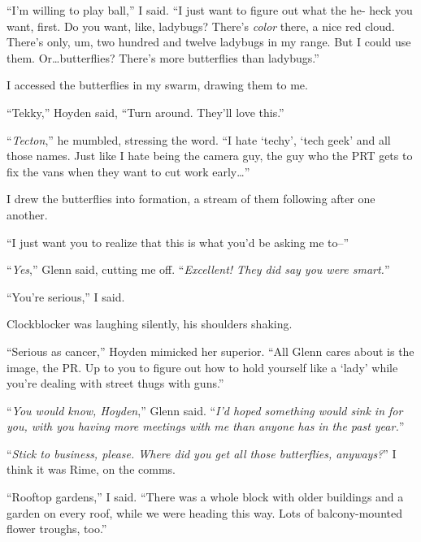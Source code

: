 ``I'm willing to play ball,'' I said.  ``I just want to figure out what the he- heck you want, first.  Do you want, like, ladybugs?  There's \emph{color} there, a nice red cloud.  There's only, um, two hundred and twelve ladybugs in my range.  But I could use them.  Or\ldots butterflies?  There's more butterflies than ladybugs.''



I accessed the butterflies in my swarm, drawing them to me.



``Tekky,'' Hoyden said, ``Turn around.  They'll love this.''



``\emph{Tecton},'' he mumbled, stressing the word.  ``I hate `techy', `tech geek' and all those names.  Just like I hate being the camera guy, the guy who the PRT gets to fix the vans when they want to cut work early\ldots''



I drew the butterflies into formation, a stream of them following after one another.



``I just want you to realize that this is what you'd be asking me to--''



``\emph{Yes},'' Glenn said, cutting me off.  ``\emph{Excellent!  They did say you were smart.}''



``You're serious,'' I said.



Clockblocker was laughing silently, his shoulders shaking.



``Serious as cancer,'' Hoyden mimicked her superior.  ``All Glenn cares about is the image, the PR.  Up to you to figure out how to hold yourself like a `lady' while you're dealing with street thugs with guns.''



``\emph{You would know, Hoyden},'' Glenn said.  ``\emph{I'd hoped something would sink in for you, with you having more meetings with me than anyone has in the past year.}''



``\emph{Stick to business, please.  Where did you get all those butterflies, anyways?}'' I think it was Rime, on the comms.



``Rooftop gardens,'' I said.  ``There was a whole block with older buildings and a garden on every roof, while we were heading this way.  Lots of balcony-mounted flower troughs, too.''



